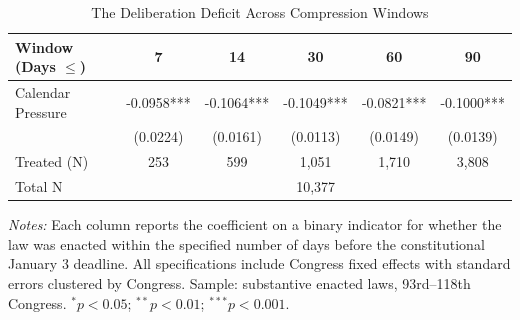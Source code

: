 \begin{table}[t]
\centering
\caption{The Deliberation Deficit Across Compression Windows}
\label{tab:gradient}
\begin{tabular}{lccccc}
\toprule
Window (Days $\leq$) & 7 & 14 & 30 & 60 & 90 \\
\midrule
Calendar Pressure & -0.0958*** & -0.1064*** & -0.1049*** & -0.0821*** & -0.1000*** \\
 & (0.0224) & (0.0161) & (0.0113) & (0.0149) & (0.0139) \\
\midrule
Treated (N) &   253 &   599 & 1,051 & 1,710 & 3,808 \\
Total N & \multicolumn{5}{c}{10,377} \\
\bottomrule
\end{tabular}
\begin{tablenotes}
\item \textit{Notes:} Each column reports the coefficient on a binary indicator for whether the law was enacted within the specified number of days before the constitutional January 3 deadline. All specifications include Congress fixed effects with standard errors clustered by Congress. Sample: substantive enacted laws, 93rd--118th Congress. $^{*}p<0.05$; $^{**}p<0.01$; $^{***}p<0.001$.
\end{tablenotes}
\end{table}
